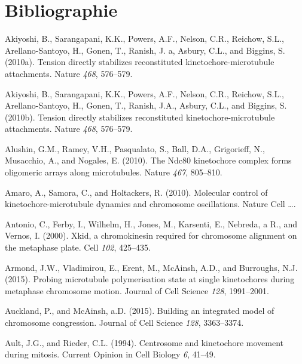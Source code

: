 \documentclass[12pt,a4paper,twoside,openright]{book}
\begin{document}
\clearpage\null

\backmatter

\chapter{Bibliographie}\label{bibliographie}



\hypertarget{refs}{}
\hypertarget{ref-Akiyoshi2010a}{}
Akiyoshi, B., Sarangapani, K.K., Powers, A.F., Nelson, C.R., Reichow,
S.L., Arellano-Santoyo, H., Gonen, T., Ranish, J. a, Asbury, C.L., and
Biggins, S. (2010a). Tension directly stabilizes reconstituted
kinetochore-microtubule attachments. Nature \emph{468}, 576--579.

\hypertarget{ref-Akiyoshi2010}{}
Akiyoshi, B., Sarangapani, K.K., Powers, A.F., Nelson, C.R., Reichow,
S.L., Arellano-Santoyo, H., Gonen, T., Ranish, J.A., Asbury, C.L., and
Biggins, S. (2010b). Tension directly stabilizes reconstituted
kinetochore-microtubule attachments. Nature \emph{468}, 576--579.

\hypertarget{ref-Alushin2010}{}
Alushin, G.M., Ramey, V.H., Pasqualato, S., Ball, D.A., Grigorieff, N.,
Musacchio, A., and Nogales, E. (2010). The Ndc80 kinetochore complex
forms oligomeric arrays along microtubules. Nature \emph{467}, 805--810.

\hypertarget{ref-Amaro2010a}{}
Amaro, A., Samora, C., and Holtackers, R. (2010). Molecular control of
kinetochore-microtubule dynamics and chromosome oscillations. Nature
Cell \ldots{}.

\hypertarget{ref-Antonio2000a}{}
Antonio, C., Ferby, I., Wilhelm, H., Jones, M., Karsenti, E., Nebreda, a
R., and Vernos, I. (2000). Xkid, a chromokinesin required for chromosome
alignment on the metaphase plate. Cell \emph{102}, 425--435.

\hypertarget{ref-Armond2015}{}
Armond, J.W., Vladimirou, E., Erent, M., McAinsh, A.D., and Burroughs,
N.J. (2015). Probing microtubule polymerisation state at single
kinetochores during metaphase chromosome motion. Journal of Cell Science
\emph{128}, 1991--2001.

\hypertarget{ref-Auckland2015a}{}
Auckland, P., and McAinsh, a.D. (2015). Building an integrated model of
chromosome congression. Journal of Cell Science \emph{128}, 3363--3374.

\hypertarget{ref-Ault1994}{}
Ault, J.G., and Rieder, C.L. (1994). Centrosome and kinetochore movement
during mitosis. Current Opinion in Cell Biology \emph{6}, 41--49.
\end{document}
